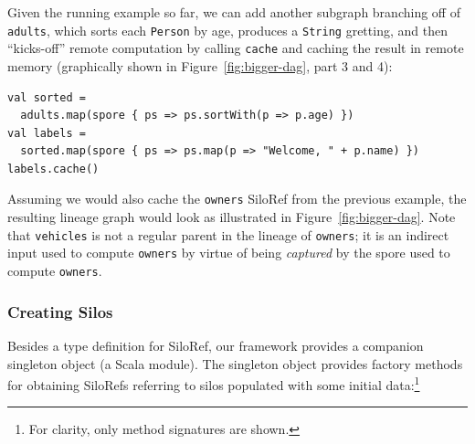 \documentclass[10pt]{sigplanconf}
\theoremstyle{definition}
\theoremstyle{definition}
\begin{document}
Given the running example so far, we can add another subgraph branching off of
\verb|adults|, which sorts each \verb|Person| by age, produces a \verb|String|
gretting, and then ``kicks-off'' remote computation by calling \verb|cache| and
caching the result in remote memory (graphically shown in
Figure~\ref{fig:bigger-dag}, part 3 and 4):

\begin{lstlisting}
val sorted =
  adults.map(spore { ps => ps.sortWith(p => p.age) })
val labels =
  sorted.map(spore { ps => ps.map(p => "Welcome, " + p.name) })
labels.cache()
\end{lstlisting}
\noindent
Assuming we would also cache the \verb|owners| SiloRef from the previous
example, the resulting lineage graph would look as illustrated in
Figure~\ref{fig:bigger-dag}. Note that \verb|vehicles|
is not a regular parent in the lineage of \verb|owners|; it is an indirect
input used to compute \verb|owners| by virtue of being {\em captured} by the
spore used to compute \verb|owners|.



%

\subsubsection{Creating Silos}
\label{sec:creating-silos}

Besides a type definition for SiloRef, our framework provides a
companion singleton object (a Scala module). The singleton object
provides factory methods for obtaining SiloRefs referring to silos
populated with some initial data:\footnote{For clarity, only method
  signatures are shown.}
\end{document}

